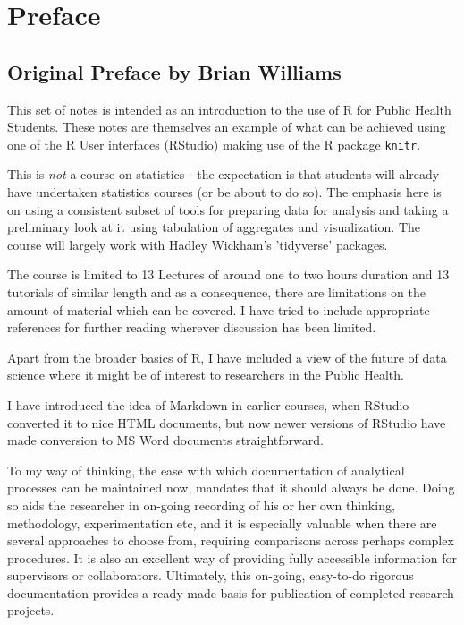 \documentclass[titlepage]{book}\usepackage{knitr}
\begin{document}
\chapter{Preface}

\section{Original Preface by Brian Williams}

\author{Brian Williams $<$\href{mailto:bjw649@gmail.com}%
{bjw649@gmail.com}$>$}

This set of notes is intended as an introduction to the use of R for Public Health Students.  These notes are themselves an example of what can be achieved using one of the R User interfaces (RStudio) making use of the R package \texttt{knitr}. 

This is \textsl{not} a course on statistics - the expectation is that students will already have undertaken statistics courses (or be about to do so).  The emphasis here is on using a consistent subset of tools for preparing data for analysis and taking a preliminary look at it using tabulation of aggregates and visualization. The course will largely work with Hadley Wickham's 'tidyverse' packages. 

The course is limited to 13 Lectures of around one to two hours duration and 13 tutorials of similar length and as a consequence, there are limitations on the amount of material which can be covered.  I have tried to include appropriate references for further reading wherever discussion has been limited. 

Apart from the broader basics of R, I have included a view of the future of data science where it might be of interest to researchers in the Public Health. 

I have introduced the idea of Markdown in earlier courses, when RStudio converted it to nice HTML documents, but now newer versions of RStudio have made conversion to MS Word documents straightforward. 

To my way of thinking, the ease with which documentation of analytical processes can be maintained now, mandates that it should always be done.  Doing so aids the researcher in on-going recording of his or her own thinking, methodology, experimentation etc, and it is especially valuable when there are several approaches to choose from, requiring comparisons across perhaps complex procedures.  It is also an excellent way of providing fully accessible information for supervisors or collaborators.  Ultimately, this on-going, easy-to-do rigorous documentation provides a ready made basis for publication of completed research projects.
\end{document}
